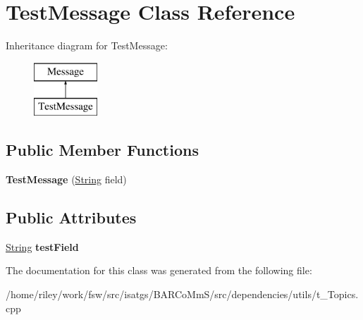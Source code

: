 \hypertarget{class_test_message}{}\section{Test\+Message Class Reference}
\label{class_test_message}
Inheritance diagram for Test\+Message\+:\begin{figure}[H]
\begin{center}
\leavevmode
\includegraphics[height=2.000000cm]{class_test_message}
\end{center}
\end{figure}
\subsection*{Public Member Functions}
\begin{DoxyCompactItemize}
\item 
{\bfseries Test\+Message} (\hyperlink{classisat__utils_1_1_string}{String} field)\hypertarget{class_test_message_abe4e0762a38a82f484df022245372f2a}{}\label{class_test_message_abe4e0762a38a82f484df022245372f2a}

\end{DoxyCompactItemize}
\subsection*{Public Attributes}
\begin{DoxyCompactItemize}
\item 
\hyperlink{classisat__utils_1_1_string}{String} {\bfseries test\+Field}\hypertarget{class_test_message_ac1d519ab042074bdd62e58e06c42cc0e}{}\label{class_test_message_ac1d519ab042074bdd62e58e06c42cc0e}

\end{DoxyCompactItemize}


The documentation for this class was generated from the following file\+:\begin{DoxyCompactItemize}
\item 
/home/riley/work/fsw/src/isatgs/\+B\+A\+R\+Co\+Mm\+S/src/dependencies/utils/t\+\_\+\+Topics.\+cpp\end{DoxyCompactItemize}
